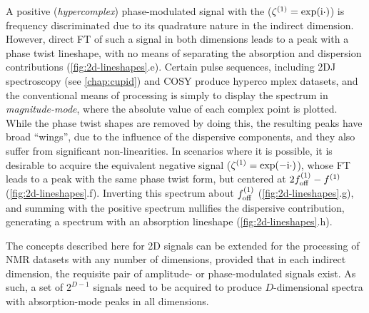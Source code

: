 A positive (\emph{hypercomplex}) phase-modulated signal with the ($\zeta^{(1)}
= \exp(\mathrm{i} \cdot)$) is frequency discriminated due to
its quadrature nature in the indirect dimension. However, direct \ac{FT} of
such a signal in both dimensions leads to a peak with a phase twist lineshape,
with no means of
separating the absorption and dispersion contributions (\cref{fig:2d-lineshapes}.e). Certain pulse
sequences, including \ac{2DJ} spectroscopy\cite{Aue1976,Morris2009} (see
\cref{chap:cupid}) and
\ac{COSY}\cite{Jeener1971,Jeener2016,Aue1976a} produce hyperco mplex datasets,
and the conventional means of processing is simply to display the
spectrum in \emph{magnitude-mode}, where the absolute value of each complex
point is plotted. While the phase twist shapes are removed by doing this, the
resulting peaks have broad ``wings'', due to the influence of the
dispersive components, and they also suffer from significant non-linearities.
In scenarios where it is possible, it is desirable to acquire the equivalent
negative signal ($\zeta^{(1)} = \exp(-\mathrm{i} \cdot)$), whose \ac{FT} leads to a
peak with the same phase twist form, but centered at $2f_{\mathrm{off}}^{(1)} - f^{(1)}$
(\cref{fig:2d-lineshapes}.f).
Inverting this spectrum about $f_{\mathrm{off}}^{(1)}$ (\cref{fig:2d-lineshapes}.g), and summing with the positive
spectrum nullifies the dispersive contribution, generating a spectrum with an
absorption lineshape\cite{Davis1992} (\cref{fig:2d-lineshapes}.h).

The concepts described here for \ac{2D} signals can be extended for the
processing of \ac{NMR} datasets with any number of dimensions, provided that in
each indirect dimension, the requisite pair of amplitude- or phase-modulated
signals exist. As such, a set of $2^{D-1}$ signals need to be acquired to
produce $D$-dimensional spectra with absorption-mode peaks in all dimensions.

